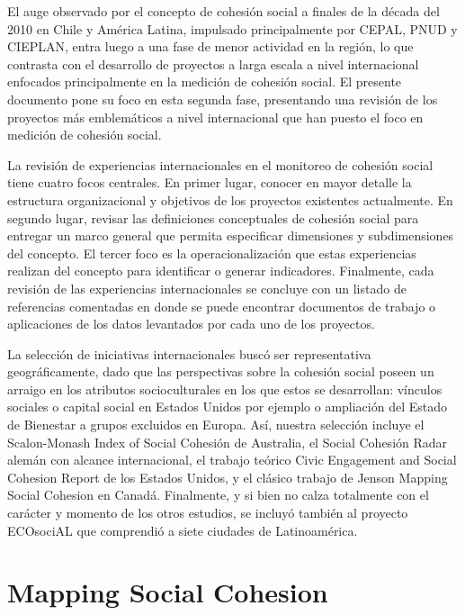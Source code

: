 \documentclass[
  12pt,
]{book}
\begin{document}
El auge observado por el concepto de cohesión social a finales de la década del 2010 en Chile y América Latina, impulsado principalmente por CEPAL, PNUD y CIEPLAN, entra luego a una fase de menor actividad en la región, lo que contrasta con el desarrollo de proyectos a larga escala a nivel internacional enfocados principalmente en la medición de cohesión social. El presente documento pone su foco en esta segunda fase, presentando una revisión de los proyectos más emblemáticos a nivel internacional que han puesto el foco en medición de cohesión social.

La revisión de experiencias internacionales en el monitoreo de cohesión
social tiene cuatro focos centrales. En primer lugar, conocer en mayor
detalle la estructura organizacional y objetivos de los proyectos
existentes actualmente. En segundo lugar, revisar las definiciones
conceptuales de cohesión social para entregar un marco general que permita especificar dimensiones y subdimensiones del concepto. El tercer foco
es la operacionalización que estas experiencias realizan del concepto
para identificar o generar indicadores. Finalmente, cada
revisión de las experiencias internacionales se concluye con un listado
de referencias comentadas en donde se puede encontrar documentos de
trabajo o aplicaciones de los datos levantados por cada uno de los
proyectos.

La selección de iniciativas internacionales buscó ser representativa geográficamente, dado que las perspectivas sobre la cohesión social poseen un arraigo en los atributos socioculturales en los que estos se desarrollan: vínculos sociales o capital social en Estados Unidos por ejemplo o ampliación del Estado de Bienestar a grupos excluidos en Europa. Así, nuestra selección incluye el Scalon-Monash Index of Social Cohesión de Australia, el Social Cohesión Radar alemán con alcance internacional, el trabajo teórico Civic Engagement and Social Cohesion Report de los Estados Unidos, y el clásico trabajo de Jenson \citetext{\citeyear{jenson1998mapping}; \citeyear{jenson2010defining}} Mapping Social Cohesion en Canadá. Finalmente, y si bien no calza totalmente con el carácter y momento de los otros estudios, se incluyó también al proyecto ECOsociAL que comprendió a siete ciudades de Latinoamérica.

\hypertarget{mapping-social-cohesion}{%
\chapter{Mapping Social Cohesion}\label{mapping-social-cohesion}}
\end{document}
